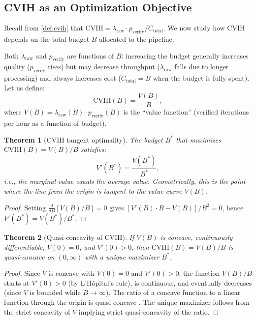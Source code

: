 \documentclass[11pt, a4paper, logo, copyright]{googledeepmind}
\newtheorem{theorem}{Theorem}[section]
\begin{document}
\subsection{CVIH as an Optimization Objective}

Recall from \cref{def:cvih} that $\text{CVIH} = \lambda_{\text{raw}} \cdot p_{\text{verify}} / C_{\text{total}}$. We now study how CVIH depends on the total budget $B$ allocated to the pipeline.

Both $\lambda_{\text{raw}}$ and $p_{\text{verify}}$ are functions of $B$: increasing the budget generally increases quality ($p_{\text{verify}}$ rises) but may decrease throughput ($\lambda_{\text{raw}}$ falls due to longer processing) and always increases cost ($C_{\text{total}} = B$ when the budget is fully spent). Let us define:
\begin{equation}\label{eq:cvih-budget}
    \text{CVIH}(B) = \frac{V(B)}{B},
\end{equation}
where $V(B) = \lambda_{\text{raw}}(B) \cdot p_{\text{verify}}(B)$ is the ``value function'' (verified iterations per hour as a function of budget).

\begin{theorem}[CVIH tangent optimality]\label{thm:cvih-tangent}
The budget $B^*$ that maximizes $\text{CVIH}(B) = V(B)/B$ satisfies:
\begin{equation}\label{eq:cvih-tangent}
    V'(B^*) = \frac{V(B^*)}{B^*},
\end{equation}
i.e., the marginal value equals the average value. Geometrically, this is the point where the line from the origin is tangent to the value curve $V(B)$.
\end{theorem}

\begin{proof}
Setting $\frac{d}{dB}[V(B)/B] = 0$ gives $[V'(B) \cdot B - V(B)] / B^2 = 0$, hence $V'(B^*) = V(B^*)/B^*$.
\end{proof}

\begin{theorem}[Quasi-concavity of CVIH]\label{thm:cvih-quasi}
If $V(B)$ is concave, continuously differentiable, $V(0) = 0$, and $V'(0) > 0$, then $\text{CVIH}(B) = V(B)/B$ is quasi-concave on $(0, \infty)$ with a unique maximizer $B^*$.
\end{theorem}

\begin{proof}
Since $V$ is concave with $V(0) = 0$ and $V'(0) > 0$, the function $V(B)/B$ starts at $V'(0) > 0$ (by L'H\^{o}pital's rule), is continuous, and eventually decreases (since $V$ is bounded while $B \to \infty$). The ratio of a concave function to a linear function through the origin is quasi-concave \citep{boyd2004}. The unique maximizer follows from the strict concavity of $V$ implying strict quasi-concavity of the ratio.
\end{proof}
\end{document}
